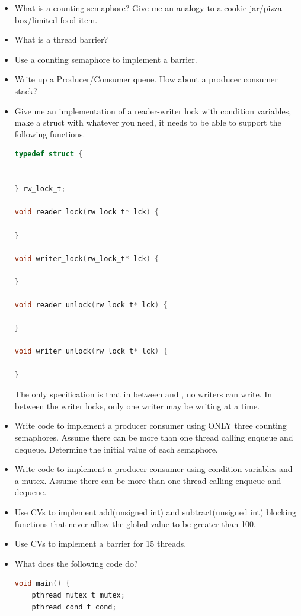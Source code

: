 \begin{itemize}
\begin{lstlisting}[language=C]
if(not_ready){
  pthread_cond_wait(&cv, &mtx);
}
\end{lstlisting}

\item
  What is a counting semaphore? Give me an analogy to a cookie jar/pizza box/limited food item.
\item
  What is a thread barrier?
\item
  Use a counting semaphore to implement a barrier.
\item
  Write up a Producer/Consumer queue. How about a producer consumer stack?
\item
  Give me an implementation of a reader-writer lock with condition variables, make a struct with whatever you need, it needs to be able to support the following functions.

\begin{lstlisting}[language=C]
typedef struct {


} rw_lock_t;

void reader_lock(rw_lock_t* lck) {

}

void writer_lock(rw_lock_t* lck) {

}

void reader_unlock(rw_lock_t* lck) {

}

void writer_unlock(rw_lock_t* lck) {

}
\end{lstlisting}

  The only specification is that in between  and , no writers can write. In between the writer locks, only one writer may be writing at a time.
\item
  Write code to implement a producer consumer using ONLY three counting semaphores. Assume there can be more than one thread calling enqueue and dequeue. Determine the initial value of each semaphore.
\item
  Write code to implement a producer consumer using condition variables and a mutex. Assume there can be more than one thread calling enqueue and dequeue.
\item
  Use CVs to implement add(unsigned int) and subtract(unsigned int) blocking functions that never allow the global value to be greater than 100.
\item
  Use CVs to implement a barrier for 15 threads.
\item
  What does the following code do?
\begin{lstlisting}[language=C]
void main() {
    pthread_mutex_t mutex;
    pthread_cond_t cond;


\end{lstlisting}
\end{itemize}
